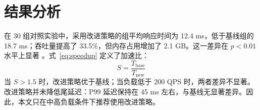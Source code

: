 \section{结果分析}

在 30 组对照实验中，采用改进策略的组平均响应时间为 12.4 ms，低于基线组的 18.7 ms；吞吐量提高了 33.5\%，但内存占用增加了 2.1 GB。这一差异在 $p < 0.01$ 水平上显著 \cite{smith2020bench, lee2021eval}。式~\eqref{eq:speedup} 定义了加速比：
\begin{equation}
  S = \frac{T_{\text{base}}}{T_{\text{new}}} \label{eq:speedup}
\end{equation}
当 $S > 1.5$ 时，改进策略优于基线；当负载低于 200 QPS 时，两者差异不显著。改进策略并未降低尾延迟：P99 延迟保持在 45 ms 左右，与基线无显著差异。因此，本文只在中高负载条件下推荐使用改进策略。
